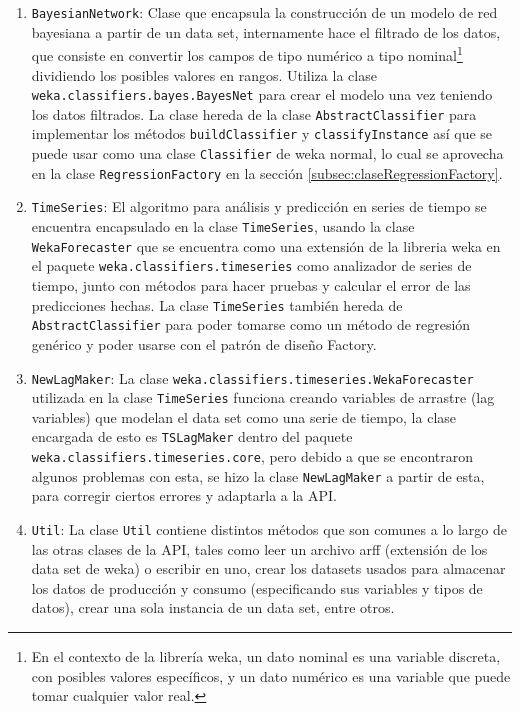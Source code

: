 \renewcommand{\labelenumi}{$\bullet$ }
\begin{enumerate}
	\item \texttt{BayesianNetwork}: Clase que encapsula la construcción de un modelo de red bayesiana a partir de un data set, internamente hace el filtrado de los datos, que consiste en convertir los campos de tipo numérico a tipo nominal\footnote{En el contexto de la librería weka, un dato nominal es una variable discreta, con posibles valores específicos, y un dato numérico es una variable que puede tomar cualquier valor real.} dividiendo los posibles valores en rangos. Utiliza la clase \texttt{weka.classifiers.bayes.BayesNet} para crear el modelo una vez teniendo los datos filtrados. La clase hereda de la clase \texttt{AbstractClassifier} para implementar los métodos \texttt{buildClassifier} y \texttt{classifyInstance} así que se puede usar como una clase \texttt{Classifier} de weka normal, lo cual se aprovecha en la clase \texttt{RegressionFactory} en la sección \ref{subsec:claseRegressionFactory}.
	
	\item \texttt{TimeSeries}: El algoritmo para análisis y predicción en series de tiempo se encuentra encapsulado en la clase \texttt{TimeSeries}, usando la clase \texttt{WekaForecaster} que se encuentra como una extensión de la libreria weka en el paquete \texttt{weka.classifiers.timeseries} como analizador de series de tiempo, junto con métodos para hacer pruebas y calcular el error de las predicciones hechas. La clase \texttt{TimeSeries} también hereda de \texttt{AbstractClassifier} para poder tomarse como un método de regresión genérico y poder usarse con el patrón de diseño Factory. %
	
	\item \texttt{NewLagMaker}: La clase \texttt{weka.classifiers.timeseries.WekaForecaster} utilizada en la clase \texttt{TimeSeries} funciona creando variables de arrastre (lag variables) que modelan el data set como una serie de tiempo, la clase encargada de esto es \texttt{TSLagMaker} dentro del paquete \texttt{weka.classifiers.timeseries.core}, pero debido a que se encontraron algunos problemas con esta, se hizo la clase \texttt{NewLagMaker} a partir de esta, para corregir ciertos errores y adaptarla a la API.
	
	\item \texttt{Util}: La clase \texttt{Util} contiene distintos métodos que son comunes a lo largo de las otras clases de la API, tales como leer un archivo arff (extensión de los data set de weka) o escribir en uno, crear los datasets usados para almacenar los datos de producción y consumo (especificando sus variables y tipos de datos), crear una sola instancia de un data set, entre otros.
	

\end{enumerate}
